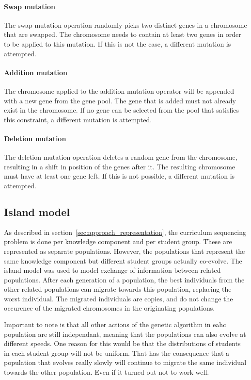 \paragraph{Swap mutation} The swap mutation operation randomly picks two
distinct genes in a chromosome that are swapped. The chromosome needs to
contain at least two genes in order to be applied to this mutation. If this is
not the case, a different mutation is attempted.

\paragraph{Addition mutation} The chromosome applied to the addition mutation
operator will be appended with a new gene from the gene pool. The gene that is
added must not already exist in the chromosome. If no gene can be selected from
the pool that satisfies this constraint, a different mutation is attempted.

\paragraph{Deletion mutation} The deletion mutation operation deletes a random
gene from the chromosome, resulting in a shift in position of the genes after
it. The resulting chromosome must have at least one gene left. If this is not
possible, a different mutation is attempted.

\subsection{Island model}
\label{sec:approach_island_model}
As described in section~\ref{sec:approach_representation}, the curriculum
sequencing problem is done per knowledge component and per student group. These
are represented as separate populations. However, the populations that
represent the same knowledge component but different student groups actually
co-evolve. The island model was used to model exchange of information between
related populations. After each generation of a population, the best
individuals from the other related populations can migrate towards this
population, replacing the worst individual. The migrated individuals are
copies, and do not change the occurence of the migrated chromosomes in the
originating populations.

Important to note is that all other actions of the genetic algorithm in eahc
population are still independant, meaning that the populations can also evolve
at different speeds. One reason for this would be that the distributions of
students in each student group will not be uniform. That has the consequence
that a population that evolves really slowly will continue to migrate the same
individual towards the other population. Even if it turned out not to work
well.


